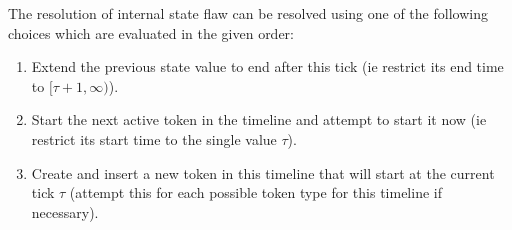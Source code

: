 The resolution of internal state flaw can be resolved using one of the
following choices which are evaluated in the given order:

\begin{enumerate}

\item Extend the previous state value to end after this tick (ie
  restrict its end time to $[\tau+1, \infty)$). 

\item Start the next active token in the timeline and
  attempt to start it now (ie restrict its start time to the single
  value $\tau$).

\item Create and insert a new token in this timeline that will start
  at the current tick $\tau$ (attempt this for each possible token
  type for this timeline if necessary). 

\end{enumerate}

